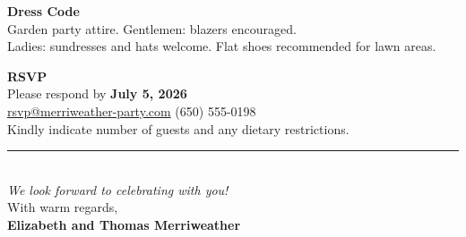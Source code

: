 \documentclass[
    language=english,
    doctype=invitation,
    institution=none,
]{../../omnilatex}
\begin{document}
\begin{center}
    {\large\bfseries Dress Code}\\[0.5em]
    Garden party attire. Gentlemen: blazers encouraged.\\
    Ladies: sundresses and hats welcome. Flat shoes recommended for lawn areas.
\end{center}

\vspace{1.5em}

\begin{center}
    {\large\bfseries RSVP}\\[0.5em]
    Please respond by \textbf{July 5, 2026}\\[0.3em]
    \href{mailto:rsvp@merriweather-party.com}{rsvp@merriweather-party.com}
    \hfill (650) 555-0198\\[0.3em]
    Kindly indicate number of guests and any dietary restrictions.
\end{center}

\vspace{1.5em}

\begin{center}
    \noindent\rule{0.5\textwidth}{0.4pt}\\[0.8em]
    {\itshape We look forward to celebrating with you!}\\[0.5em]
    {\small With warm regards,}\\
    {\small\bfseries Elizabeth and Thomas Merriweather}
\end{center}
\end{document}

